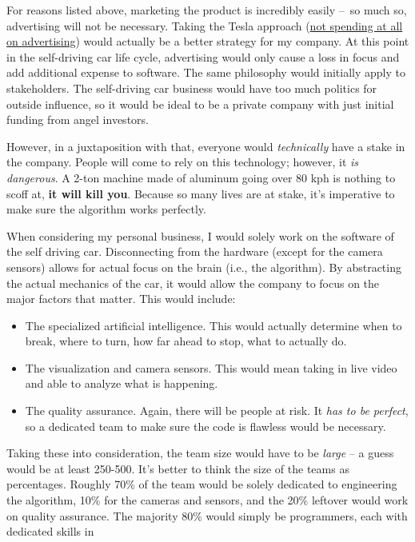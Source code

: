 \documentclass[12pt]{article}
\begin{document}
For reasons listed above, marketing the product is incredibly easily --~so much so, advertising will not be necessary. Taking the Tesla approach (\href{http://insideevs.com/teslas-advertisement-cost-just-6-per-car/}{not spending at all on advertising}) would actually be a better strategy for my company. At this point in the self-driving car life cycle, advertising would only cause a loss in focus and add additional expense to software. The same philosophy would initially apply to stakeholders. The self-driving car business would have too much politics for outside influence, so it would be ideal to be a private company with just initial funding from angel investors.

However, in a juxtaposition with that, everyone would \emph{technically} have a stake in the company. People will come to rely on this technology; however, it \emph{is dangerous}. A 2-ton machine made of aluminum going over 80 kph is nothing to scoff at, \textbf{it will kill you}. Because so many lives are at stake, it's imperative to make sure the algorithm works perfectly.

When considering my personal business, I would solely work on the software of the self driving car. Disconnecting from the hardware (except for the camera sensors) allows for actual focus on the brain (i.e., the algorithm). By abstracting the actual mechanics of the car, it would allow the company to focus on the major factors that matter. This would include:

\begin{itemize}
    \item The specialized artificial intelligence. This would actually determine when to break, where to turn, how far ahead to stop, what to actually do.
    \item The visualization and camera sensors. This would mean taking in live video and able to analyze what is happening.
    \item The quality assurance. Again, there will be people at risk. It \emph{has to be perfect}, so a dedicated team to make sure the code is flawless would be necessary.
\end{itemize}

Taking these into consideration, the team size would have to be \emph{large} -- a guess would be at least 250-500. It's better to think the size of the teams as percentages. Roughly 70\% of the team would be solely dedicated to engineering the algorithm, 10\% for the cameras and sensors, and the 20\% leftover would work on quality assurance. The majority 80\% would simply be programmers, each with dedicated skills in
\end{document}
